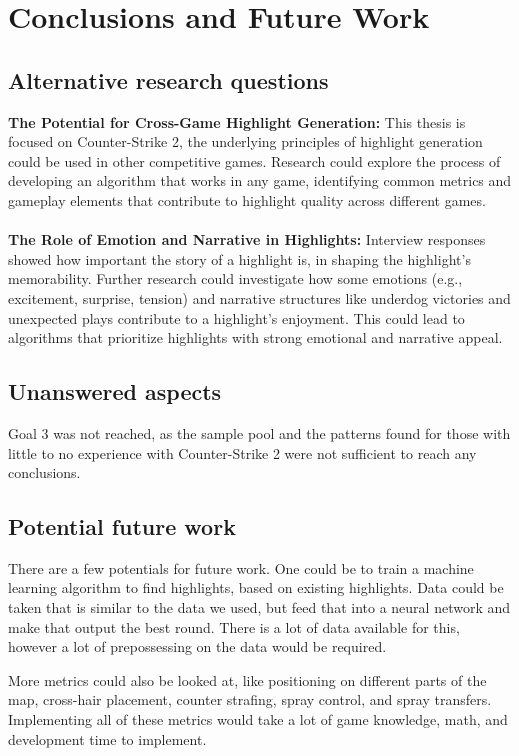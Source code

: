 \chapter{Conclusions and Future Work}
\label{chp:conclusions}

\section{Alternative research questions}
\textbf{The Potential for Cross-Game Highlight Generation:} This thesis is focused on Counter-Strike 2, the underlying principles of highlight generation could be used in other competitive games. Research could explore the process of developing an algorithm that works in any game, identifying common metrics and gameplay elements that contribute to highlight quality across different games.\\\\
\textbf{The Role of Emotion and Narrative in Highlights:} Interview responses showed how important the story of a highlight is, in shaping the highlight's memorability. Further research could investigate how some emotions (e.g., excitement, surprise, tension) and narrative structures like underdog victories and unexpected plays contribute to a highlight's enjoyment. This could lead to algorithms that prioritize highlights with strong emotional and narrative appeal.
\section{Unanswered aspects}
Goal 3 was not reached, as the sample pool and the patterns found for those with little to no experience with Counter-Strike 2 were not sufficient to reach any conclusions.
\section{Potential future work}
There are a few potentials for future work. One could be to train a machine learning algorithm to find highlights, based on existing highlights. Data could be taken that is similar to the data we used, but feed that into a neural network and make that output the best round. There is a lot of data available for this, however a lot of prepossessing on the data would be required.

More metrics could also be looked at, like positioning on different parts of the map, cross-hair placement, counter strafing, spray control, and spray transfers. Implementing all of these metrics would take a lot of game knowledge, math, and development time to implement.

